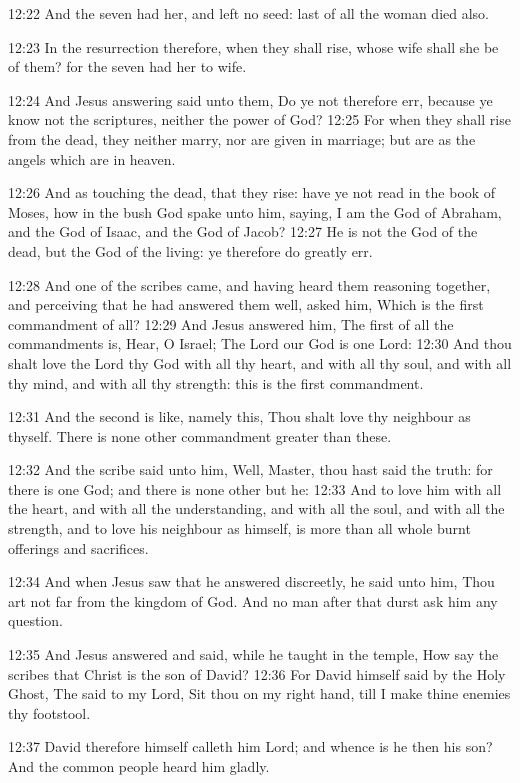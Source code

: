 12:22 And the seven had her, and left no seed: last of all the woman
died also.

12:23 In the resurrection therefore, when they shall rise, whose wife
shall she be of them? for the seven had her to wife.

12:24 And Jesus answering said unto them, Do ye not therefore err,
because ye know not the scriptures, neither the power of God?  12:25
For when they shall rise from the dead, they neither marry, nor are
given in marriage; but are as the angels which are in heaven.

12:26 And as touching the dead, that they rise: have ye not read in
the book of Moses, how in the bush God spake unto him, saying, I am
the God of Abraham, and the God of Isaac, and the God of Jacob?  12:27
He is not the God of the dead, but the God of the living: ye therefore
do greatly err.

12:28 And one of the scribes came, and having heard them reasoning
together, and perceiving that he had answered them well, asked him,
Which is the first commandment of all?  12:29 And Jesus answered him,
The first of all the commandments is, Hear, O Israel; The Lord our God
is one Lord: 12:30 And thou shalt love the Lord thy God with all thy
heart, and with all thy soul, and with all thy mind, and with all thy
strength: this is the first commandment.

12:31 And the second is like, namely this, Thou shalt love thy
neighbour as thyself. There is none other commandment greater than
these.

12:32 And the scribe said unto him, Well, Master, thou hast said the
truth: for there is one God; and there is none other but he: 12:33 And
to love him with all the heart, and with all the understanding, and
with all the soul, and with all the strength, and to love his
neighbour as himself, is more than all whole burnt offerings and
sacrifices.

12:34 And when Jesus saw that he answered discreetly, he said unto
him, Thou art not far from the kingdom of God. And no man after that
durst ask him any question.

12:35 And Jesus answered and said, while he taught in the temple, How
say the scribes that Christ is the son of David?  12:36 For David
himself said by the Holy Ghost, The \LORD said to my Lord, Sit thou on
my right hand, till I make thine enemies thy footstool.

12:37 David therefore himself calleth him Lord; and whence is he then
his son? And the common people heard him gladly.

